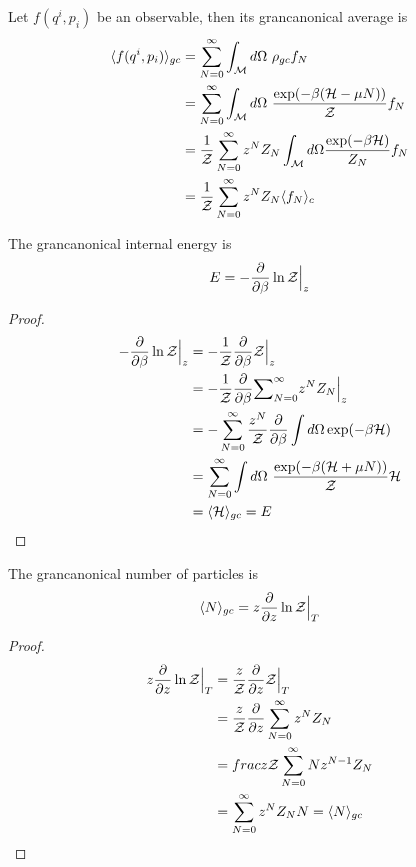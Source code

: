     Let $f(q^i, p_i)$ be an observable, then its grancanonical average is 
    \begin{equation*}\label{obsgc}
    \begin{aligned}
        \langle f(q^i, p_i)\rangle_{gc} & = \sum_{N = 0}^{\infty} \int_{\mathcal M} d\Omega ~ \rho_{gc} f_N \\ & = \sum_{N = 0}^{\infty} \int_{\mathcal M} d\Omega ~ \frac{\exp (-\beta (\mathcal H - \mu N ))}{\mathcal Z} f_N \\ & = \frac{1}{\mathcal Z} \sum_{N=0}^{\infty} z^N Z_N \int_{\mathcal M} d\Omega \frac{\exp(-\beta \mathcal H)}{Z_N} f_N \\ & = \frac{1}{\mathcal Z} \sum_{N=0}^{\infty} z^N Z_N \langle f_N\rangle_{c}
    \end{aligned}
    \end{equation*}

    The grancanonical internal energy is 
    \begin{equation*}
        E = - \frac{\partial}{\partial\beta} \ln \mathcal Z \Big \vert_z
    \end{equation*}

    \begin{proof}
        \begin{equation*}
        \begin{aligned}
            - \frac{\partial}{\partial\beta} \ln \mathcal Z \Big \vert_z & = - \frac{1}{\mathcal Z} \frac{\partial}{\partial\beta} \mathcal Z \Big \vert_z \\ &  = - \frac{1}{\mathcal Z} \frac{\partial}{\partial\beta} \mathcal \sum_{N=0}^{\infty} z^N Z_N \Big \vert_z \\ & = - \sum_{N=0}^{\infty} \frac{z^N}{\mathcal Z} \frac{\partial}{\partial\beta} \int d\Omega \exp (-\beta \mathcal H) \\ & = \sum_{N=0}^{\infty} \int d\Omega ~ \frac{\exp(-\beta (\mathcal H + \mu N))}{\mathcal Z} \mathcal H \\ & = \langle\mathcal H\rangle_{gc} = E  
        \end{aligned}
        \end{equation*}
    \end{proof}

    The grancanonical number of particles is 
    \begin{equation*}
        \langle N\rangle_{gc} = z \frac{\partial}{\partial z} \ln \mathcal Z \Big \vert_T
    \end{equation*}

    \begin{proof}
        \begin{equation*}
        \begin{aligned}
            z \frac{\partial}{\partial z} \ln \mathcal Z \Big \vert_T & = \frac{z}{\mathcal Z} \frac{\partial}{\partial z}\mathcal Z \Big \vert_T \\ & = \frac{z}{\mathcal Z} \frac{\partial}{\partial z} \sum_{N=0}^{\infty} z^N Z_N \\ & = frac{z}{\mathcal Z} \sum_{N=0}^{\infty} N z^{N-1} Z_N \\ & = \sum_{N=0}^{\infty} z^N Z_N N = \langle N\rangle_{gc}
        \end{aligned}
        \end{equation*}
    \end{proof}

